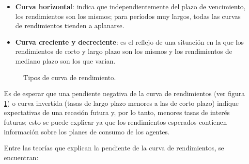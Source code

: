 \begin{itemize}
   \item \textbf{Curva horizontal}: indica que independientemente del plazo de vencimiento, los rendimientos son los mismos; para per\'iodos muy largos, todas las      curvas de rendimientos tienden a aplanarse.
\end{itemize}

\newpage

\begin{itemize}
  \item \textbf{Curva creciente y decreciente}: es el reflejo de una situaci\'on en la    que los rendimientos de corto y largo plazo son los mismos y los rendimientos  de mediano plazo son los que var\'ian.
\end{itemize}

\begin{figure}[h]
\caption{Tipos de curva de rendimiento.}
\label{tipos_c}
\end{figure}

\hspace*{0.4 cm} Es de esperar que una pendiente negativa de la curva de rendimientos (ver figura \ref{tipos_c}) o curva invertida (tasas de largo plazo menores a las de corto plazo) indique expectativas de una recesi\'on futura y, por lo tanto, menores tasas de inter\'es futuras; esto se puede explicar ya que los rendimientos esperados contienen informaci\'on sobre los planes de consumo de los agentes. 

\hspace*{0.4 cm} Entre las teor\'ias que explican la pendiente de la curva de rendimientos, se encuentran:

